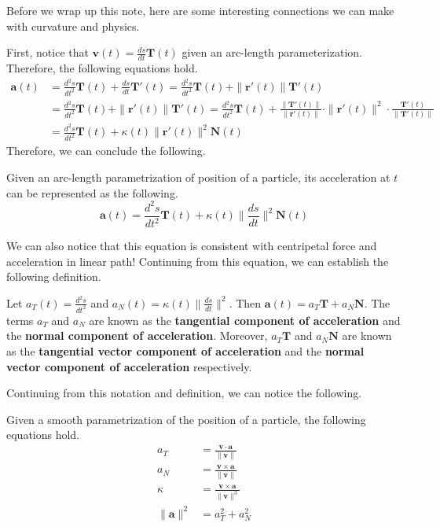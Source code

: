\documentclass[../../../main.tex]{subfiles}
\begin{document}
Before we wrap up this note, here are some interesting connections
we can make with curvature and physics.

First, notice that $\mathbf{v}(t) = \frac{ds}{dt} \mathbf{T}(t)$
given an arc-length parameterization. Therefore, the following
equations hold.
\begin{align*}
    \mathbf{a}(t)
    &= \frac{d^2s}{dt^2} \mathbf{T}(t)
        + \frac{ds}{dt} \mathbf{T}'(t)
    = \frac{d^2s}{dt^2} \mathbf{T}(t)
        + \| \mathbf{r}'(t) \| \mathbf{T}'(t) \\
    &= \frac{d^2s}{dt^2} \mathbf{T}(t)
        + \| \mathbf{r}'(t) \| \mathbf{T}'(t)
    = \frac{d^2s}{dt^2} \mathbf{T}(t)
        + \frac{ \| \mathbf{T}'(t) \| }{ \| \mathbf{r}'(t) \| }
            \cdot \| \mathbf{r}'(t) \|^2
            \cdot \frac{\mathbf{T}'(t)}{ \| \mathbf{T}'(t) \| } \\
    &= \frac{d^2s}{dt^2} \mathbf{T}(t)
        + \kappa(t) \| \mathbf{r}'(t) \|^2 \mathbf{N}(t)
\end{align*}
Therefore, we can conclude the following.

\begin{important}
Given an arc-length parametrization of position of a particle,
its acceleration at $t$ can be represented as the following.
\[
\mathbf{a}(t)
= \frac{d^2s}{dt^2} \mathbf{T}(t)
    + \kappa(t) \| \frac{ds}{dt} \|^2 \mathbf{N}(t)
\]
\end{important}

We can also notice that this equation is consistent with centripetal
force and acceleration in linear path! Continuing from this equation,
we can establish the following definition.

\begin{definition}{}{}
Let $a_T(t) = \frac{d^2s}{dt^2}$ and $a_N(t) = \kappa(t)
\| \frac{ds}{dt} \|^2$. Then $\mathbf{a}(t) = a_T \mathbf{T} +
a_N \mathbf{N}$. The terms $a_T$ and $a_N$ are known as the
\textbf{tangential component of acceleration} and the
\textbf{normal component of acceleration}. Moreover, $a_T \mathbf{T}$
and $a_N \mathbf{N}$ are known as the \textbf{tangential vector
component of acceleration} and the \textbf{normal vector component of
acceleration} respectively.
\end{definition}

Continuing from this notation and definition, we can notice the
following.

\begin{important}
Given a smooth parametrization of the position of a particle,
the following equations hold.
\begin{align*}
    a_T &= \frac{\mathbf{v} \cdot \mathbf{a}}{\| \mathbf{v} \|} \\
    a_N &= \frac{\mathbf{v} \times \mathbf{a}}{\| \mathbf{v} \|} \\
    \kappa
    &= \frac{\mathbf{v} \times \mathbf{a}}{\| \mathbf{v} \|^3} \\
    \| \mathbf{a} \|^2 &= a_T^2 + a_N^2
\end{align*}
\end{important}
\end{document}
